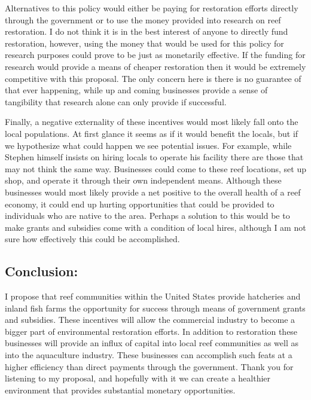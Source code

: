 \documentclass[11pt]{article}
\begin{document}
Alternatives to this policy would either be paying for restoration efforts directly through the government or to use the money provided into research on reef restoration. I do not think it is in the best interest of anyone to directly fund restoration, however, using the money that would be used for this policy for research purposes could prove to be just as monetarily effective. If the funding for research would provide a means of cheaper restoration then it would be extremely competitive with this proposal. The only concern here is there is no guarantee of that ever happening, while up and coming businesses provide a sense of tangibility that research alone can only provide if successful.

Finally, a negative externality of these incentives would most likely fall onto the local populations. At first glance it seems as if it would benefit the locals, but if we hypothesize what could happen we see potential issues. For example, while Stephen himself insists on hiring locals to operate his facility there are those that may not think the same way. Businesses could come to these reef locations, set up shop, and operate it through their own independent means. Although these businesses would most likely provide a net positive to the overall health of a reef economy, it could end up hurting opportunities that could be provided to individuals who are native to the area. Perhaps a solution to this would be to make grants and subsidies come with a condition of local hires, although I am not sure how effectively this could be accomplished. 

\subsection*{Conclusion:}

I propose that reef communities within the United States provide hatcheries and inland fish farms the opportunity for success through means of government grants and subsidies. These incentives will allow the commercial industry to become a bigger part of environmental restoration efforts. In addition to restoration these businesses will provide an influx of capital into local reef communities as well as into the aquaculture industry. These businesses can accomplish such feats at a higher efficiency than direct payments through the government. Thank you for listening to my proposal, and hopefully with it we can create a healthier environment that provides substantial monetary opportunities.
\end{document}
